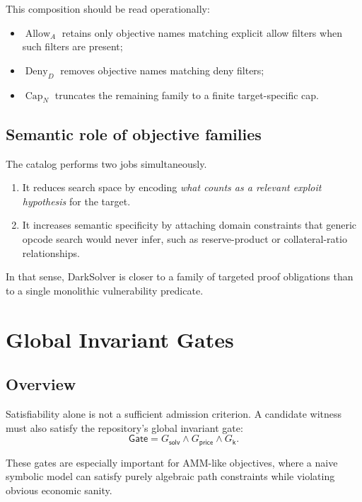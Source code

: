 \documentclass[11pt]{article}
\numberwithin{equation}{section}
\theoremstyle{remark}
\newcommand{\Gate}{\mathsf{Gate}}
\newcommand{\solv}{\mathsf{solv}}
\newcommand{\price}{\mathsf{price}}
\newcommand{\kgate}{\mathsf{k}}
\begin{document}
This composition should be read operationally:
\begin{itemize}[leftmargin=1.5em]
  \item \(\operatorname{Allow}_{A}\) retains only objective names matching explicit allow filters when such filters are present;
  \item \(\operatorname{Deny}_{D}\) removes objective names matching deny filters;
  \item \(\operatorname{Cap}_{N}\) truncates the remaining family to a finite target-specific cap.
\end{itemize}

\subsection{Semantic role of objective families}

The catalog performs two jobs simultaneously.
\begin{enumerate}[leftmargin=1.5em]
  \item It reduces search space by encoding \emph{what counts as a relevant exploit hypothesis} for the target.
  \item It increases semantic specificity by attaching domain constraints that generic opcode search would never infer, such as reserve-product or collateral-ratio relationships.
\end{enumerate}

In that sense, DarkSolver is closer to a family of targeted proof obligations than to a single monolithic vulnerability predicate.

\section{Global Invariant Gates}
\label{sec:gates}

\subsection{Overview}

Satisfiability alone is not a sufficient admission criterion. A candidate witness must also satisfy the repository's global invariant gate:
\begin{equation}
\label{eq:gate-overview}
\Gate = G_{\solv} \land G_{\price} \land G_{\kgate}.
\end{equation}

These gates are especially important for AMM-like objectives, where a naive symbolic model can satisfy purely algebraic path constraints while violating obvious economic sanity.
\end{document}

